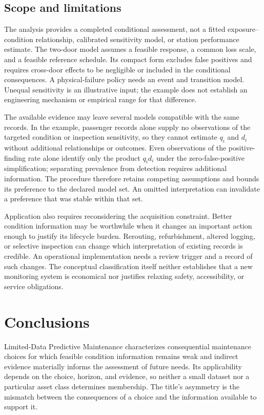 \documentclass[symmetry,article,submit,pdftex,oneauthor]{Definitions/mdpi}
\begin{document}
\subsection{Scope and limitations}

The analysis provides a completed conditional assessment, not a fitted exposure--condition relationship, calibrated sensitivity model, or station performance estimate. The two-door model assumes a feasible response, a common loss scale, and a feasible reference schedule. Its compact form excludes false positives and requires cross-door effects to be negligible or included in the conditional consequences. A physical-failure policy needs an event and transition model. Unequal sensitivity is an illustrative input; the example does not establish an engineering mechanism or empirical range for that difference.

The available evidence may leave several models compatible with the same records. In the example, passenger records alone supply no observations of the targeted condition or inspection sensitivity, so they cannot estimate $q_i$ and $d_i$ without additional relationships or outcomes. Even observations of the positive-finding rate alone identify only the product $q_i d_i$ under the zero-false-positive simplification; separating prevalence from detection requires additional information. The procedure therefore retains competing assumptions and bounds its preference to the declared model set. An omitted interpretation can invalidate a preference that was stable within that set.

Application also requires reconsidering the acquisition constraint. Better condition information may be worthwhile when it changes an important action enough to justify its lifecycle burden. Rerouting, refurbishment, altered logging, or selective inspection can change which interpretation of existing records is credible. An operational implementation needs a review trigger and a record of such changes. The conceptual classification itself neither establishes that a new monitoring system is economical nor justifies relaxing safety, accessibility, or service obligations.

\section{Conclusions}
\label{sec:conclusions}

Limited-Data Predictive Maintenance characterizes consequential maintenance choices for which feasible condition information remains weak and indirect evidence materially informs the assessment of future needs. Its applicability depends on the choice, horizon, and evidence, so neither a small dataset nor a particular asset class determines membership. The title's asymmetry is the mismatch between the consequences of a choice and the information available to support it.
\end{document}
